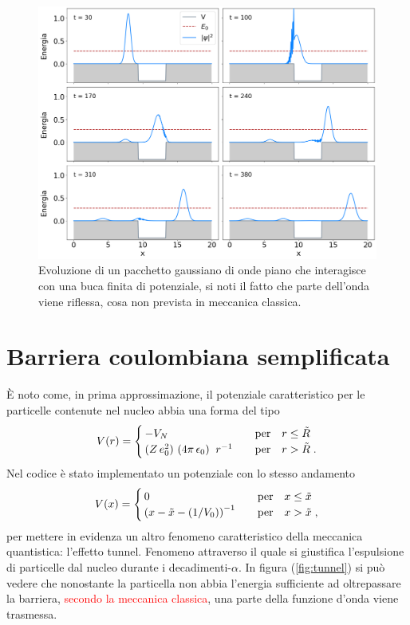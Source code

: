 \begin{figure}
    \centering
    \includegraphics[width = \textwidth]{immagini/hole.png}
    \caption{Evoluzione di un pacchetto gaussiano di onde piano che interagisce con una buca finita di potenziale, si noti il fatto che parte dell'onda viene riflessa, cosa non prevista in meccanica classica.}
    \label{fig:finite_hole}
\end{figure}

\section{Barriera coulombiana semplificata}
\label{sec:coulomb}

È noto come, in prima approssimazione, il potenziale caratteristico per le particelle contenute nel nucleo abbia una forma del tipo
\begin{equation}
    \centering
    V(r) = 
    \begin{cases}
        \, - V_{N} \quad &\text{per} \quad r \le \tilde{R} \\
        \, (Z \, e_0^2) \ (4 \pi \, \epsilon_0) \;\; r^{-1} \quad &\text{per} \quad r > \tilde{R}      \; \text{.}
    \end{cases}
    \label{eq:C_pot}
\end{equation} 
Nel codice è stato implementato un potenziale con lo stesso andamento 
\begin{equation}
    \centering
    V(x) = 
    \begin{cases}
        \, 0 \quad &\text{per} \quad x \le \tilde{x} \\
        \, \left( x - \tilde{x} - (1 / V_0)\right)^{-1} \quad &\text{per} \quad x > \tilde{x}  \; \text{,}
    \end{cases}
    \label{eq:tunnel}
\end{equation} 
per mettere in evidenza un altro fenomeno caratteristico della meccanica quantistica: l'effetto tunnel.
Fenomeno attraverso il quale si giustifica l'espulsione di particelle dal nucleo durante i decadimenti-$\alpha$.
In figura (\ref{fig:tunnel}) si può vedere che nonostante la particella non abbia l'energia sufficiente ad oltrepassare la barriera, \textcolor{red}{secondo la meccanica classica}, una parte della funzione d'onda viene trasmessa.

